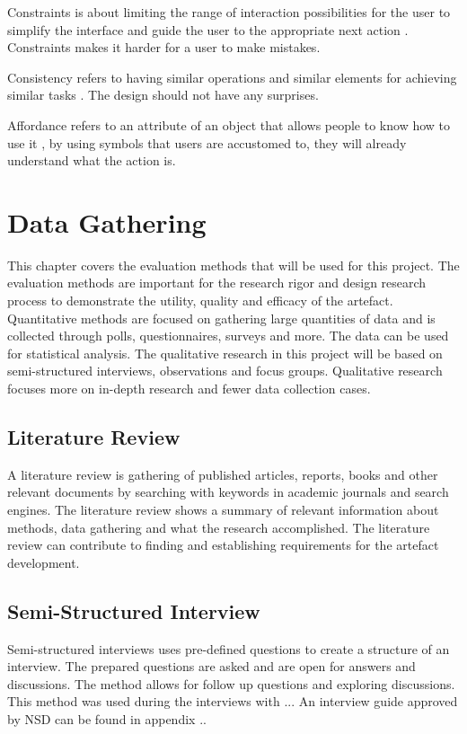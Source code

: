 Constraints is about limiting the range of interaction possibilities for the user to simplify the interface and guide the user to the appropriate next action \cite{Norman}. Constraints makes it harder for a user to make mistakes.

Consistency refers to having similar operations and similar elements for achieving similar tasks \cite{Norman}. The design should not have any surprises.

Affordance refers to an attribute of an object that allows people to know how to use it \cite{Norman}, by using symbols that users are accustomed to, they will already understand what the action is. 


\section{Data Gathering}
This chapter covers the evaluation methods that will be used for this project. The evaluation methods are important for the research rigor and design research process to demonstrate the utility, quality and efficacy of the artefact.
Quantitative methods are focused on gathering large quantities of data and is collected through polls, questionnaires, surveys and more. The data can be used for statistical analysis.
The qualitative research in this project will be based on semi-structured interviews, observations and focus groups. Qualitative research focuses more on in-depth research and fewer data collection cases.

\subsection{Literature Review}
A literature review is gathering of published articles, reports, books and other relevant documents by searching with keywords in academic journals and search engines. The literature review shows a summary of relevant information about methods, data gathering and what the research accomplished. The literature review can contribute to finding and establishing requirements for the artefact development.

\subsection{Semi-Structured Interview}
Semi-structured interviews uses pre-defined questions to create a structure of an interview. The prepared questions are asked and are open for answers and discussions. The method allows for follow up questions and exploring discussions. This method was used during the interviews with ... An interview guide approved by NSD can be found in appendix ..

